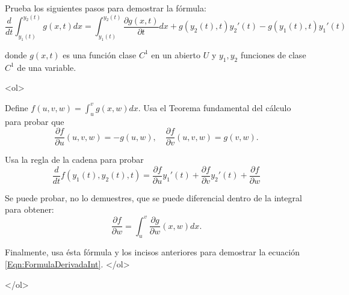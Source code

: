\documentclass{article}
\theoremstyle{definition}
\begin{document}
\item Prueba los siguientes pasos para demostrar la  fórmula:
  \begin{equation}\label{Eqn:FormulaDerivadaInt}
  \frac{d}{dt} \int_{y_1(t)}^{y_2(t)}g(x,t)dx=
  \int_{y_1(t)}^{y_2(t)}\frac{\partial g(x,t)}{\partial t}dx+ g(y_2(t),t)y_2'(t)
  -g(y_1(t),t)y_1'(t)
  \end{equation}

  donde $g(x,t)$ es una función clase $C^1$ en un abierto $U$
  y $y_1,y_2$ funciones de clase $C^1$ de una variable.

  <ol>
  \item Define $f(u,v,w)=\int_u^v g(x,w)dx$. Usa el Teorema fundamental
    del cálculo para probar que
    $$
    \frac{\partial f}{\partial u}(u,v,w)=-g(u,w),
    \quad \frac{\partial f}{\partial v}(u,v,w)=g(v,w).
    $$

  \item Usa la regla de la cadena para probar
    $$
    \frac{d}{dt} f(y_1(t),y_2(t),t)= \frac{\partial f}{\partial u}
    y_1'(t)+ \frac{\partial f}{\partial v}y_2'(t)
    +\frac{\partial f}{\partial w}
    $$

  \item Se puede probar, no lo demuestres, que se puede diferencial
    dentro  de la integral para obtener:
    $$
    \frac{\partial f}{\partial w}=\int_{u}^v
    \frac{\partial g}{\partial w}(x,w)dx.
    $$

    Finalmente, usa ésta fórmula y los incisos anteriores
    para demostrar la ecuación \eqref{Eqn:FormulaDerivadaInt}. 
  </ol>
  
  
</ol>

  
       
\end{document}
